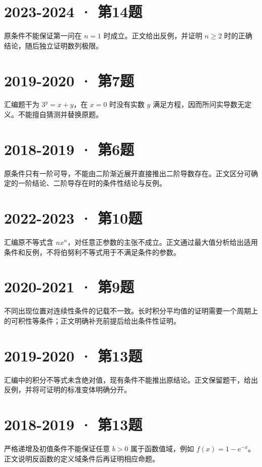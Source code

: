 \documentclass[UTF8,fontset=fandol,12pt,oneside,openany]{ctexrep}
\newcommand{\ee}{\mathrm e}
\theoremstyle{definition}
\begin{document}
\section*{2023-2024 · 第14题}

原条件不能保证第一问在 $n=1$ 时成立。正文给出反例，并证明 $n\ge2$ 时的正确结论，随后独立证明数列极限。

\section*{2019-2020 · 第7题}

汇编题干为 $3^y=x+y$，在 $x=0$ 时没有实数 $y$ 满足方程，因而所问实导数无定义。不能擅自猜测并替换原题。

\section*{2018-2019 · 第6题}

原条件只有一阶可导，不能由二阶渐近展开直接推出二阶导数存在。正文区分可确定的一阶结论、二阶导存在时的条件性结论与反例。

\section*{2022-2023 · 第10题}

汇编原不等式含 $nx^n$，对任意正参数的主张不成立。正文通过最大值分析给出适用条件和反例，不将伯努利不等式用于不满足条件的参数。

\section*{2020-2021 · 第9题}

不同出现位置对连续性条件的记载不一致。长时积分平均值的证明需要一个周期上的可积性等条件；正文明确补充前提后给出条件性证明。

\section*{2019-2020 · 第13题}

汇编中的积分不等式未含绝对值，现有条件不能推出原结论。正文保留题干，给出反例，并将可证明的标准变体明确分开。

\section*{2018-2019 · 第13题}

严格递增及初值条件不能保证任意 $b>0$ 属于函数值域，例如 $f(x)=1-\ee^{-x}$。正文说明反函数的定义域条件后再证明相应命题。
\end{document}
